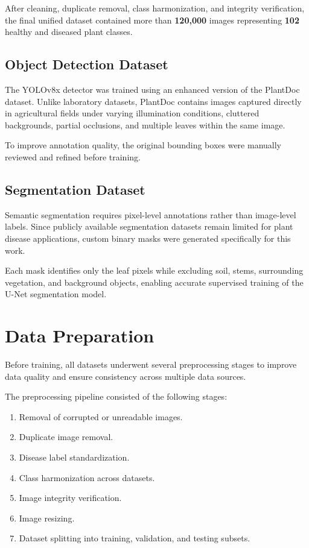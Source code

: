 After cleaning, duplicate removal, class harmonization, and integrity verification, the final unified dataset contained more than \textbf{120,000} images representing \textbf{102} healthy and diseased plant classes.

\subsection{Object Detection Dataset}

The YOLOv8x detector was trained using an enhanced version of the PlantDoc dataset. Unlike laboratory datasets, PlantDoc contains images captured directly in agricultural fields under varying illumination conditions, cluttered backgrounds, partial occlusions, and multiple leaves within the same image.

To improve annotation quality, the original bounding boxes were manually reviewed and refined before training.

\subsection{Segmentation Dataset}

Semantic segmentation requires pixel-level annotations rather than image-level labels. Since publicly available segmentation datasets remain limited for plant disease applications, custom binary masks were generated specifically for this work.

Each mask identifies only the leaf pixels while excluding soil, stems, surrounding vegetation, and background objects, enabling accurate supervised training of the U-Net segmentation model.

\section{Data Preparation}
\label{sec:data_preparation}

Before training, all datasets underwent several preprocessing stages to improve data quality and ensure consistency across multiple data sources.

The preprocessing pipeline consisted of the following stages:

\begin{enumerate}[leftmargin=*,label=\textbf{P\arabic*.}]
\item Removal of corrupted or unreadable images.
\item Duplicate image removal.
\item Disease label standardization.
\item Class harmonization across datasets.
\item Image integrity verification.
\item Image resizing.
\item Dataset splitting into training, validation, and testing subsets.
\end{enumerate}

